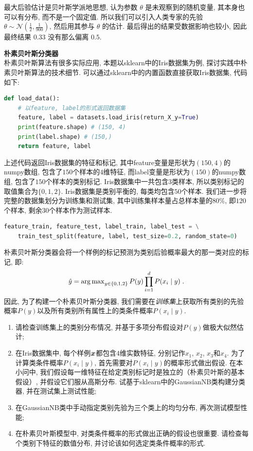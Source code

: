 \documentclass[answers]{exam}  %
\begin{document}
\begin{questions}
\begin{solution}
\begin{enumerate}
            最大后验估计是贝叶斯学派地思想, 认为参数 $\theta$ 是未观察到的随机变量, 其本身也可以有分布, 而不是一个固定值. 所以我们可以引入人类专家的先验 $\theta \sim \mathcal{N}(\frac{1}{2}, \frac{1}{900})$, 然后用其参与 $\theta$ 的估计. 最后得出的结果受数据影响也较小, 因此最终结果 $0.33$ 没有那么偏离 $0.5$.
    \end{enumerate}
  \end{solution}


  \question [20] \textbf{朴素贝叶斯分类器} \\
  朴素贝叶斯算法有很多实际应用, 本题以sklearn中的Iris数据集为例, 探讨实践中朴素贝叶斯算法的技术细节. 可以通过sklearn中的内置函数直接获取Iris数据集, 代码如下:
  \begin{lstlisting}[language=Python]
def load_data():
    # 以feature, label的形式返回数据集
    feature, label = datasets.load_iris(return_X_y=True)
    print(feature.shape) # (150, 4)
    print(label.shape) # (150,)
    return feature, label
\end{lstlisting}
  上述代码返回Iris数据集的特征和标记, 其中feature变量是形状为$(150, 4)$的numpy数组, 包含了$150$个样本的$4$维特征, 而label变量是形状为$(150)$的numpy数组, 包含了$150$个样本的类别标记. Iris数据集中一共包含$3$类样本, 所以类别标记的取值集合为$\{0,1,2\}$. Iris数据集是类别平衡的, 每类均包含$50$个样本. 我们进一步将完整的数据集划分为训练集和测试集, 其中训练集样本量占总样本量的$80\%$, 即$120$个样本, 剩余$30$个样本作为测试样本.
  \begin{lstlisting}[language=Python]
feature_train, feature_test, label_train, label_test = \
    train_test_split(feature, label, test_size=0.2, random_state=0)
\end{lstlisting}
  朴素贝叶斯分类器会将一个样例的标记预测为类别后验概率最大的那一类对应的标记, 即:
  \begin{equation}
    \hat{y}=\operatorname{arg\,max}_{y\in\{0,1,2\}}P(y)\prod_{i=1}^{d}P(x_i\mid y)\;.
  \end{equation}
  因此, 为了构建一个朴素贝叶斯分类器, 我们需要在{\em 训练集}上获取所有类别的先验概率$P(y)$以及所有类别所有属性上的类条件概率$P(x_i\mid y)$.

  \begin{enumerate}
    \item 请检查训练集上的类别分布情况, 并基于多项分布假设对$P(y)$做极大似然估计;
    \item 在Iris数据集中, 每个样例${\boldsymbol{x}}$都包含$4$维实数特征, 分别记作$x_1$, $x_2$, $x_3$和$x_4$. 为了计算类条件概率$P(x_i\mid y)$, 首先需要对$P(x_i\mid y)$的概率形式做出假设. 在本小问中, 我们假设每一维特征在给定类别标记时是独立的（朴素贝叶斯的基本假设）, 并假设它们服从高斯分布. 试基于sklearn中的GaussianNB类构建分类器, 并在测试集上测试性能;
    \item 在GaussianNB类中手动指定类别先验为三个类上的均匀分布, 再次测试模型性能;
    \item 在朴素贝叶斯模型中, 对类条件概率的形式做出正确的假设也很重要. 请检查每个类别下特征的数值分布, 并讨论该如何选定类条件概率的形式.
  \end{enumerate}


\end{questions}
\end{document}
